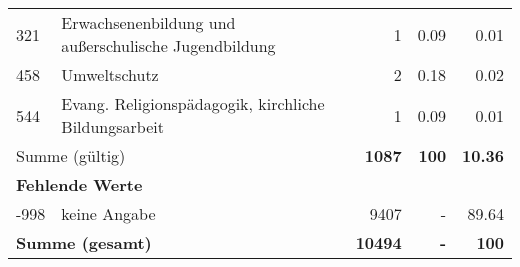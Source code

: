 \begin{longtable}{lXrrr}
        321 & \multicolumn{1}{X}{Erwachsenenbildung und außerschulische Jugendbildung} & %
          \num{1} &
          \num[round-mode=places,round-precision=2]{0.09} &
          \num[round-mode=places,round-precision=2]{0.01} \\

        458 & \multicolumn{1}{X}{Umweltschutz} & %
          \num{2} &
          \num[round-mode=places,round-precision=2]{0.18} &
          \num[round-mode=places,round-precision=2]{0.02} \\

        544 & \multicolumn{1}{X}{Evang. Religionspädagogik, kirchliche Bildungsarbeit} & %
          \num{1} &
          \num[round-mode=places,round-precision=2]{0.09} &
          \num[round-mode=places,round-precision=2]{0.01} \\

     \midrule
     \multicolumn{2}{l}{Summe (gültig)} &
       \textbf{\num{1087}} &
     \textbf{\num{100}} &
       \textbf{\num[round-mode=places,round-precision=2]{10.36}} \\
     \multicolumn{5}{l}{\textbf{Fehlende Werte}}\\
       -998 &
       keine Angabe &
         \num{9407} &
        - &
         \num[round-mode=places,round-precision=2]{89.64} \\
     \midrule
     \multicolumn{2}{l}{\textbf{Summe (gesamt)}} &
          \textbf{\num{10494}} &
        \textbf{-} &
        \textbf{\num{100}} \\
     \bottomrule
     \end{longtable}
     
